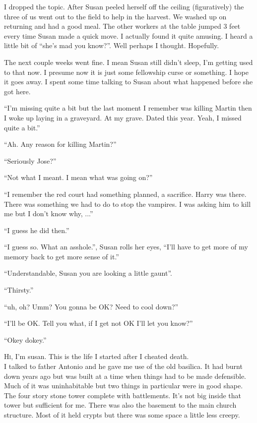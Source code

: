 I dropped the topic. After Susan peeled herself off the ceiling (figuratively) the three of us went out to the field to help in the harvest. We washed up on returning and had a good meal. The other workers at the table jumped 3 feet every time Susan made a quick move. I actually found it quite amusing. I heard a little bit of ``she's mad you know?''. Well perhaps I thought. Hopefully.

The next couple weeks went fine. I mean Susan still didn't sleep, I'm getting used to that now. I presume now it is just some fellowship curse or something. I hope it goes away. I spent some time talking to Susan about what happened before she got here.

``I'm missing quite a bit but the last moment I remember was killing Martin then I woke up laying in a graveyard. At my grave. Dated this year. Yeah, I missed quite a bit.''

``Ah. Any reason for killing Martin?''

``Seriously Jose?''

``Not what I meant. I mean what was going on?''

``I remember the red court had something planned, a sacrifice. Harry was there. There was something we had to do to stop the vampires. I was asking him to kill me but I don't know why, ...''

``I guess he did then.''

``I guess so. What an asshole.'', Susan rolls her eyes, ``I'll have to get more of my memory back to get more sense of it.''

``Understandable, Susan you are looking a little gaunt''.

``Thirsty.''

``uh, oh? Umm? You gonna be OK? Need to cool down?''

``I'll be OK. Tell you what, if I get not OK I'll let you know?''

``Okey dokey.''


\parasep

\lettrine[lines=2,lraise=0]{H}i, I'm susan. This is the life I started after I cheated death.\\

I talked to father Antonio and he gave me use of the old basilica. It had burnt down years ago but was built at a time when things had to be made defensible. Much of it was uninhabitable but two things in particular were in good shape. The four story stone tower complete with battlements. It's not big inside that tower but sufficient for me. There was also the basement to the main church structure. Most of it held crypts but there was some space a little less creepy.

